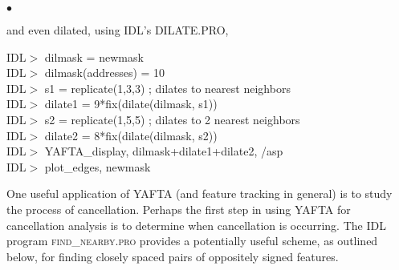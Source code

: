 \documentclass[12pt,preprint]{aastex}
\begin{document}
\begin{list}{$\bullet$}{}
%
\par
and even dilated, using IDL's DILATE.PRO,
%
\par
\indent IDL$>$ dilmask = newmask \\
\indent IDL$>$ dilmask(addresses) = 10 \\
\indent IDL$>$ s1 = replicate(1,3,3) ; dilates to nearest neighbors \\
\indent IDL$>$ dilate1 = 9*fix(dilate(dilmask, s1)) \\
\indent IDL$>$ s2 = replicate(1,5,5) ; dilates to 2 nearest neighbors \\
\indent IDL$>$ dilate2 = 8*fix(dilate(dilmask, s2)) \\
\indent IDL$>$ YAFTA\_display, dilmask+dilate1+dilate2, /asp \\
\indent IDL$>$ plot\_edges, newmask \\
\par
%
\end{list}

\noindent
One useful application of \textsc{YAFTA} (and feature tracking in
general) is to study the process of cancellation.  Perhaps the first
step in using \textsc{YAFTA} for cancellation analysis is to determine
when cancellation is occurring.  The IDL program
\textsc{find\_nearby.pro} provides a potentially useful scheme, as
outlined below, for finding closely spaced pairs of oppositely signed
features.
\end{document}
